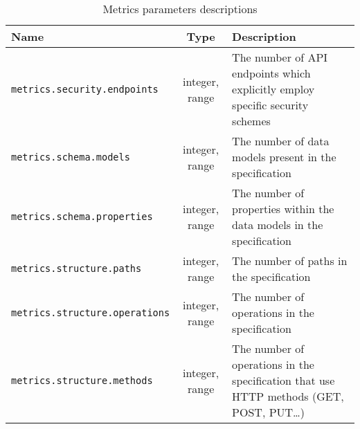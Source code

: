 \begin{table}[!h]
    \begin{center}
        \begin{tabular}{l c p{8cm}}
            \hline
            \textbf{Name} & \textbf{Type} & \textbf{Description} \\ \hline
            \verb|metrics.security.endpoints| & integer, range & The number of API endpoints which explicitly employ specific security schemes~\cite{souhaila_serbout_apistic_2024} \\
            \verb|metrics.schema.models| & integer, range & The number of data models present in the specification \\
            \verb|metrics.schema.properties| & integer, range & The number of properties within the data models in the specification \\
            \verb|metrics.structure.paths| & integer, range & The number of paths in the specification \\
            \verb|metrics.structure.operations| & integer, range & The number of operations in the specification \\
            \verb|metrics.structure.methods| & integer, range & The number of operations in the specification that use HTTP methods (GET, POST, PUT\ldots) \\ \hline
        \end{tabular}
    \end{center}

    \caption{Metrics parameters descriptions}
    \label{tab:parameters-metrics}
\end{table}
